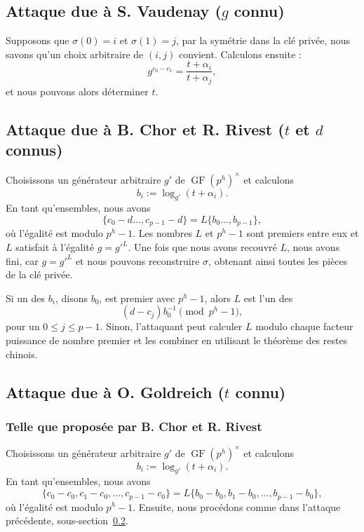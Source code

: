 \documentclass[a4paper, titlepage]{article}
\theoremstyle{definition}
\theoremstyle{remark}
\def\gf{\operatorname{GF}}
\begin{document}
\subsection{Attaque due à S. Vaudenay ($g$ connu)}

Supposons que $\sigma(0) = i$ et $\sigma(1) = j$, par la symétrie dans la clé privée, nous savons qu'un choix arbitraire de $(i,j)$ convient. Calculons ensuite :
$$g^{c_0-c_1} = \frac{t+\alpha_i}{t+\alpha_j},$$
et nous pouvons alors déterminer $t$.

\subsection{Attaque due à B. Chor et R. Rivest ($t$ et $d$ connus)}\label{attaqueTDconnus}

Choisissons un générateur arbitraire $g'$ de $\gf(p^h)^\times$ et calculons $$b_i := \log_{g'}(t+\alpha_i).$$
En tant qu'ensembles, nous avons
$$\{c_0 - d \dots, c_{p-1} -d\} = L\{b_0 \dots, b_{p-1}\},$$
où l'égalité est modulo $p^h -1$. Les nombres $L$ et $p^h-1$ sont premiers entre eux et $L$ satisfait à l'égalité $g = g'^L$. Une fois que nous avons recouvré $L$, nous avons fini, car $g=g'^L$ et nous pouvons reconstruire $\sigma$, obtenant ainsi toutes les pièces de la clé privée.

Si un des $b_i$, disons $b_0$, est premier avec $p^h-1$, alors $L$ est l'un des $$(d-c_j)b_0^{-1} \pmod{p^h-1},$$ pour un $0 \leqslant j \leqslant p-1$. Sinon, l'attaquant peut calculer $L$ modulo chaque facteur puissance de nombre premier et les combiner en utilisant le théorème des restes chinois.

\subsection{Attaque due à O. Goldreich ($t$ connu)} \label{attaqueOG}

\subsubsection{Telle que proposée par B. Chor et R. Rivest}

Choisissons un générateur arbitraire $g'$ de $\gf(p^h)^\times$ et calculons $$b_i := \log_{g'}(t+\alpha_i).$$
En tant qu'ensembles, nous avons
$$\{c_0 - c_0, c_1 - c_0, \dots, c_{p-1} -c_0\} = L\{b_0 - b_0, b_1 - b_0, \dots, b_{p-1} - b_0\},$$
où l'égalité est modulo $p^h -1$. Ensuite, nous procédons comme dans l'attaque précédente, sous-section~\ref{attaqueTDconnus}.
\end{document}
